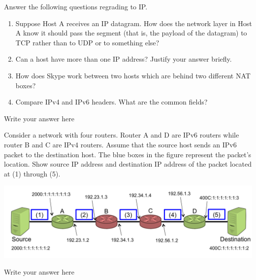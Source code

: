 \documentclass{report}
\begin{document}
\newpage



\begin{problem}
Answer the following questions regrading to IP.
    
\begin{enumerate}
    \item Suppose Host A receives an IP datagram. How does the network layer in Host A know it should pass the segment (that is, the payload of the datagram) to TCP rather than to UDP or to something else?
    \item Can a host have more than one IP address? Justify your answer briefly.
    \item How does Skype work between two hosts which are behind two different NAT boxes?
    \item Compare IPv4 and IPv6 headers. What are the common fields?
\end{enumerate}


\begin{answer}{35em}
    Write your answer here
\end{answer}

\end{problem}

\newpage



\begin{problem}
Consider a network with four routers. Router A and D are IPv6 routers while router B and C are IPv4 routers. Assume that the source host sends an IPv6 packet to the destination host. The blue boxes in the figure represent the packet's location. Show source IP address and destination IP address of the packet located at (1) through (5).

\begin{center}
\includegraphics[width=\columnwidth]{hw7_p5.png}
\end{center}

\begin{answer}{35em}
    Write your answer here
\end{answer}

\end{problem}
\end{document}
